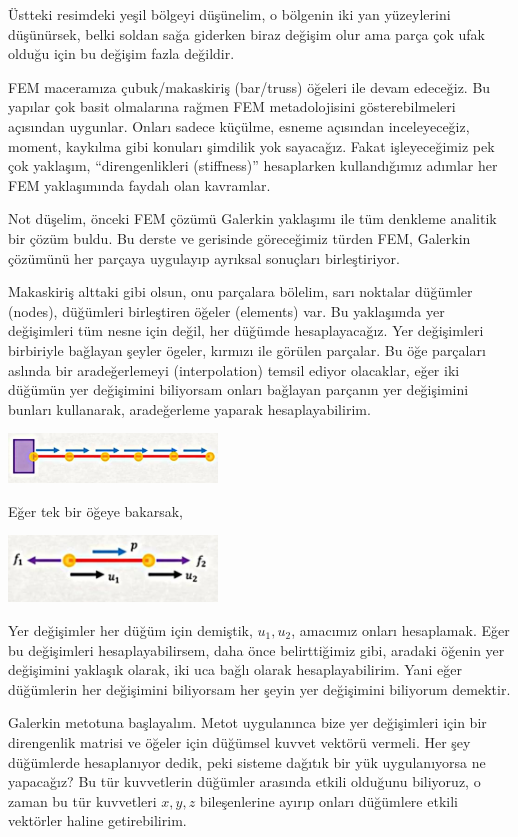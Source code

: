 \documentclass[12pt,fleqn]{article}\usepackage{../../common}
\begin{document}
Üstteki resimdeki yeşil bölgeyi düşünelim, o bölgenin iki yan yüzeylerini
düşünürsek, belki soldan sağa giderken biraz değişim olur ama parça çok ufak
olduğu için bu değişim fazla değildir. 

FEM maceramıza çubuk/makaskiriş (bar/truss) öğeleri ile devam edeceğiz.  Bu
yapılar çok basit olmalarına rağmen FEM metadolojisini gösterebilmeleri
açısından uygunlar. Onları sadece küçülme, esneme açısından inceleyeceğiz,
moment, kaykılma gibi konuları şimdilik yok sayacağız. Fakat işleyeceğimiz pek
çok yaklaşım, ``direngenlikleri (stiffness)'' hesaplarken kullandığımız adımlar
her FEM yaklaşımında faydalı olan kavramlar.

Not düşelim, önceki FEM çözümü Galerkin yaklaşımı ile tüm denkleme analitik bir
çözüm buldu. Bu derste ve gerisinde göreceğimiz türden FEM, Galerkin çözümünü
her parçaya uygulayıp ayrıksal sonuçları birleştiriyor.

Makaskiriş alttaki gibi olsun, onu parçalara bölelim, sarı noktalar düğümler
(nodes), düğümleri birleştiren öğeler (elements) var. Bu yaklaşımda yer
değişimleri tüm nesne için değil, her düğümde hesaplayacağız. Yer değişimleri
birbiriyle bağlayan şeyler ögeler, kırmızı ile görülen parçalar.  Bu öğe
parçaları aslında bir aradeğerlemeyi (interpolation) temsil ediyor olacaklar,
eğer iki düğümün yer değişimini biliyorsam onları bağlayan parçanın yer
değişimini bunları kullanarak, aradeğerleme yaparak hesaplayabilirim.

\includegraphics[width=15em]{compscieng_bpp45fem2_03.jpg}

Eğer tek bir öğeye bakarsak,

\includegraphics[width=15em]{compscieng_bpp45fem2_04.jpg}

Yer değişimler her düğüm için demiştik, $u_1,u_2$, amacımız onları hesaplamak.
Eğer bu değişimleri hesaplayabilirsem, daha önce belirttiğimiz gibi, aradaki
öğenin yer değişimini yaklaşık olarak, iki uca bağlı olarak hesaplayabilirim.
Yani eğer düğümlerin her değişimini biliyorsam her şeyin yer değişimini
biliyorum demektir.

Galerkin metotuna başlayalım. Metot uygulanınca bize yer değişimleri için bir
direngenlik matrisi ve öğeler için düğümsel kuvvet vektörü vermeli. Her şey
düğümlerde hesaplanıyor dedik, peki sisteme dağıtık bir yük uygulanıyorsa
ne yapacağız? Bu tür kuvvetlerin düğümler arasında etkili olduğunu biliyoruz,
o zaman bu tür kuvvetleri $x,y,z$ bileşenlerine ayırıp onları düğümlere etkili
vektörler haline getirebilirim.
\end{document}
